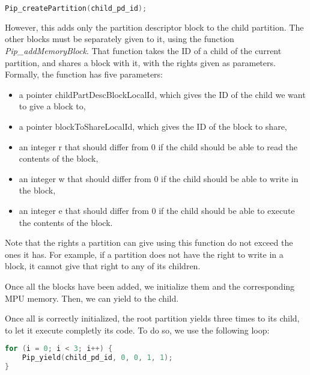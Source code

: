 \documentclass[10pt,a4paper,titlepage]{refart}
\begin{document}
\begin{lstlisting}[language=C]
Pip_createPartition(child_pd_id);
\end{lstlisting}

However, this adds only the partition descriptor block to the child partition. The other blocks must be separately given to it, using the 
function \textit{Pip\_addMemoryBlock}. That function takes the ID of a child of the current partition, and shares a block with it, with the 
rights given as parameters. Formally, the function has five parameters:
\begin{itemize}
    \item a pointer childPartDescBlockLocalId, which gives the ID of the child we want to give a block to,
    \item a pointer blockToShareLocalId, which gives the ID of the block to share,
    \item an integer r that should differ from 0 if the child should be able to read the contents of the block,
    \item an integer w that should differ from 0 if the child should be able to write in the block,
    \item an integer e that should differ from 0 if the child should be able to execute the contents of the block.
\end{itemize}

Note that the rights a partition can give using this function do not exceed the ones it has. For example, if a partition does not have the 
right to write in a block, it cannot give that right to any of its children.


Once all the blocks have been added, we initialize them and the corresponding MPU memory. Then, we can yield to the child.


Once all is correctly initialized, the root partition yields three times to its child, to let it execute completly its code. To do so, we 
use the following loop:
\begin{lstlisting}[language=C]
for (i = 0; i < 3; i++) {
    Pip_yield(child_pd_id, 0, 0, 1, 1);
}
\end{lstlisting}

\end{document}
